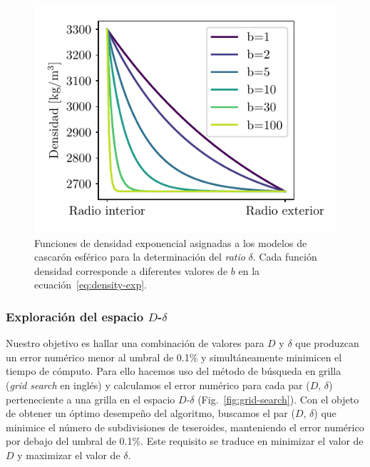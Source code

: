 \begin{figure}[!b]
\centering
\includegraphics[width=0.5\linewidth]{figs/tesseroids-variable-density/exponential-densities.pdf}
\caption{
    Funciones de densidad exponencial asignadas a los modelos de cascarón
    esférico para la determinación del \emph{ratio} $\delta$.
    Cada función densidad corresponde a diferentes valores de $b$ en la
    ecuación~\ref{eq:density-exp}.
}
\label{fig:exp-densities}
\end{figure}


\subsubsection{Exploración del espacio $D$-$\delta$}

Nuestro objetivo es hallar una combinación de valores para $D$ y $\delta$ que
produzcan un error numérico menor al umbral de 0.1\% y simultáneamente
minimicen el tiempo de cómputo.
Para ello hacemos uso del método de búsqueda en grilla (\emph{grid search} en
inglés) y calculamos el error numérico para cada par ($D$, $\delta$)
perteneciente a una grilla en el espacio $D$-$\delta$
(Fig.~\ref{fig:grid-search}).
Con el objeto de obtener un óptimo desempeño del algoritmo, buscamos el par
($D$, $\delta$) que minimice el número de subdivisiones de teseroides,
manteniendo el error numérico por debajo del umbral de 0.1\%.
Este requisito se traduce en minimizar el valor de $D$ y maximizar el valor de
$\delta$.

